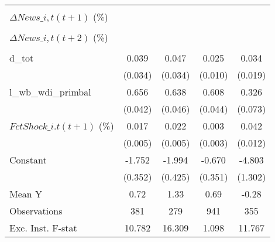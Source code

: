 {\begin{tabular}{l*{4}{c}}
                    &                     &                     &                     &                     \\
\addlinespace
$ \Delta News\_{i,t}(t+1)$ (\%)&                     &                     &                     &                     \\
                    &                     &                     &                     &                     \\
\addlinespace
$ \Delta News\_{i,t}(t+2)$ (\%)&                     &                     &                     &                     \\
                    &                     &                     &                     &                     \\
\addlinespace
d\_tot               &       0.039         &       0.047         &       0.025\sym{**} &       0.034\sym{*}  \\
                    &     (0.034)         &     (0.034)         &     (0.010)         &     (0.019)         \\
\addlinespace
l\_wb\_wdi\_primbal    &       0.656\sym{***}&       0.638\sym{***}&       0.608\sym{***}&       0.326\sym{***}\\
                    &     (0.042)         &     (0.046)         &     (0.044)         &     (0.073)         \\
\addlinespace
$ FctShock\_{i.t}(t+1)$ (\%)&       0.017\sym{***}&       0.022\sym{***}&       0.003         &       0.042\sym{***}\\
                    &     (0.005)         &     (0.005)         &     (0.003)         &     (0.012)         \\
\addlinespace
Constant            &      -1.752\sym{***}&      -1.994\sym{***}&      -0.670\sym{*}  &      -4.803\sym{***}\\
                    &     (0.352)         &     (0.425)         &     (0.351)         &     (1.302)         \\
\midrule
Mean Y              &        0.72         &        1.33         &        0.69         &       -0.28         \\
Observations        &         381         &         279         &         941         &         355         \\
Exc. Inst. F-stat   &      10.782         &      16.309         &       1.098         &      11.767         \\
\bottomrule
\end{tabular}
}
